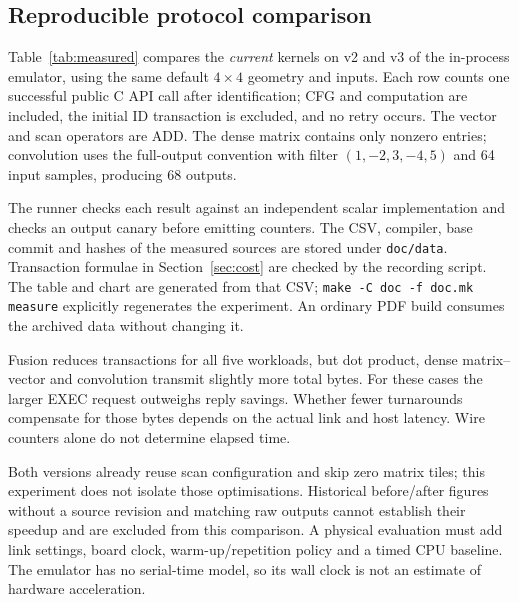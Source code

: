 \subsection{Reproducible protocol comparison}

Table~\ref{tab:measured} compares the \emph{current} kernels on v2 and v3 of
the in-process emulator, using the same default $4\times4$ geometry and
inputs. Each row counts one successful public C API call after identification;
CFG and computation are included, the initial ID transaction is excluded,
and no retry occurs. The vector and scan operators are ADD. The dense matrix
contains only nonzero entries; convolution uses the full-output convention
with filter $(1,-2,3,-4,5)$ and 64 input samples, producing 68 outputs.

The runner checks each result against an independent scalar implementation
and checks an output canary before emitting counters. The CSV, compiler,
base commit and hashes of the measured sources are stored under
\texttt{doc/data}. Transaction formulae in Section~\ref{sec:cost} are checked
by the recording script. The table and chart are generated from that CSV;
\texttt{make -C doc -f doc.mk measure} explicitly regenerates the experiment.
An ordinary PDF build consumes the archived data without changing it.





Fusion reduces transactions for all five workloads, but dot product, dense
matrix--vector and convolution transmit slightly more total bytes. For these
cases the larger EXEC request outweighs reply savings. Whether fewer
turnarounds compensate for those bytes depends on the actual link and host
latency. Wire counters alone do not determine elapsed time.

Both versions already reuse scan configuration and skip zero matrix tiles;
this experiment does not isolate those optimisations. Historical before/after
figures without a source revision and matching raw outputs cannot establish
their speedup and are excluded from this comparison. A physical evaluation
must add link settings, board clock, warm-up/repetition policy and a timed
CPU baseline. The emulator has no serial-time model, so its wall clock is not
an estimate of hardware acceleration.

